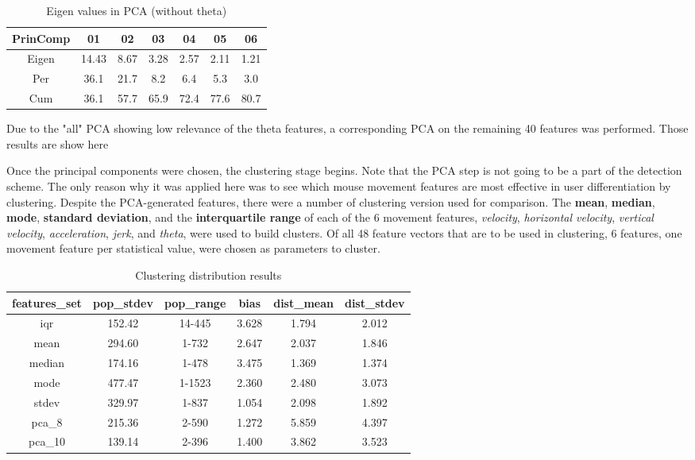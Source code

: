 \begin{table}[h!]
	\centering
	\begin{tabular}{|c|c|c|c|c|c|c|}
		\hline
		\textbf{PrinComp} & \textbf{01} & \textbf{02} & \textbf{03} & \textbf{04} & \textbf{05} & \textbf{06} \\
		\hline
		Eigen & 14.43 & 8.67 & 3.28 & 2.57 & 2.11 & 1.21 \\
		Per & 36.1 & 21.7 & 8.2 & 6.4 & 5.3 & 3.0 \\
		Cum & 36.1 & 57.7 & 65.9 & 72.4 & 77.6 & 80.7 \\
		\hline
	\end{tabular}
	\caption{Eigen values in PCA (without theta)}
	{\small Due to the "all" PCA showing low relevance of the theta features, a corresponding PCA on the remaining 40 features was performed. Those results are show here}
	\label{tab:eigen-values-without-theta}
\end{table}
\fi

Once the principal components were chosen, the clustering stage begins. Note that the PCA step is not going to be a part of the detection scheme. The only reason why it was applied here was to see which mouse movement features are most effective in user differentiation by clustering. Despite the PCA-generated features, there were a number of clustering version used for comparison. The \textbf{mean}, \textbf{median}, \textbf{mode}, \textbf{standard deviation}, and the \textbf{interquartile range} of each of the 6 movement features, \textit{velocity}, \textit{horizontal velocity}, \textit{vertical velocity}, \textit{acceleration}, \textit{jerk}, and \textit{theta}, were used to build clusters. Of all 48 feature vectors that are to be used in clustering, 6 features, one movement feature per statistical value, were chosen as parameters to cluster.

\begin{table}[h!]
	\centering
	\begin{tabular}{ |c|c|c|c|c|c| }
		\hline
		\textbf{features{\_}set} & \textbf{pop{\_}stdev} & \textbf{pop{\_}range} & \textbf{bias} & \textbf{dist{\_}mean} & \textbf{dist{\_}stdev} \\
		\hline
		iqr & 152.42 & 14-445 & 3.628 & 1.794 & 2.012 \\
		mean & 294.60 & 1-732 & 2.647 & 2.037 & 1.846 \\
		median & 174.16 & 1-478 & 3.475 & 1.369 & 1.374 \\
		mode & 477.47 & 1-1523 & 2.360 & 2.480 & 3.073 \\
		stdev & 329.97 & 1-837 & 1.054 & 2.098 & 1.892 \\
		pca{\_}8 & 215.36 & 2-590 & 1.272 & 5.859 & 4.397 \\
		pca{\_}10 & 139.14 & 2-396 & 1.400 & 3.862 & 3.523 \\
		\hline
	\end{tabular}
	\caption{Clustering distribution results}
	\label{tab:clustering-distribution-results}
\end{table}

